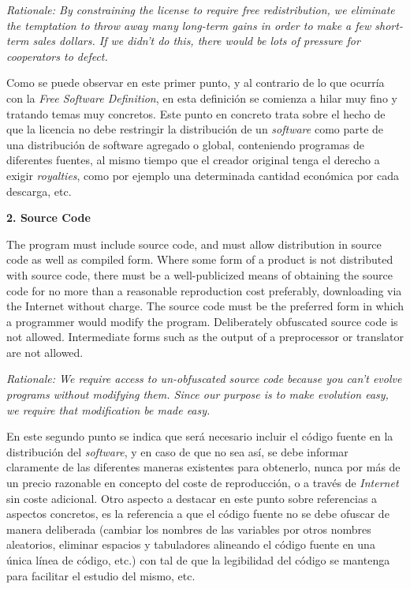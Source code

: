 \textit{Rationale: By constraining the license to require free redistribution,
we eliminate the temptation to throw away many long-term gains in order to make
a few short-term sales dollars. If we didn't do this, there would be lots
of pressure for cooperators to defect.}\vspace{0.4cm}

Como se puede observar en este primer punto, y al contrario de lo que ocurría
con la \textit{Free Software Definition}, en esta definición se comienza a hilar
muy fino y tratando temas muy concretos. Este punto en concreto trata sobre
el hecho de que la licencia no debe restringir la distribución de un
\textit{software} como parte de una distribución de software agregado o global,
conteniendo programas de diferentes fuentes, al mismo tiempo que el creador
original tenga el derecho a exigir \textit{royalties}, como por ejemplo una
determinada cantidad económica por cada descarga, etc.\vspace{0.4cm}

{\bf 2. Source Code

The program must include source code, and must allow distribution in source code
as well as compiled form. Where some form of a product is not distributed with
source code, there must be a well-publicized means of obtaining the source code
for no more than a reasonable reproduction cost preferably, downloading via the
Internet without charge. The source code must be the preferred form in which a
programmer would modify the program. Deliberately obfuscated source code is not
allowed. Intermediate forms such as the output of a preprocessor or translator
are not allowed.}

\textit{Rationale: We require access to un-obfuscated source code because you
can't evolve programs without modifying them. Since our purpose is to make
evolution easy, we require that modification be made easy.}\vspace{0.4cm}

En este segundo punto se indica que será necesario incluir el código fuente en
la distribución del \textit{software}, y en caso de que no sea así, se debe
informar claramente de las diferentes maneras existentes para obtenerlo, nunca
por más de un precio razonable en concepto del coste de reproducción, o a través
de \textit{Internet} sin coste adicional. Otro aspecto a destacar en este punto
sobre referencias a aspectos concretos, es la referencia a que el código fuente
no se debe ofuscar de manera deliberada (cambiar los nombres de las variables
por otros nombres aleatorios, eliminar espacios y tabuladores alineando el
código fuente en una única línea de código, etc.) con tal de que la legibilidad
del código se mantenga para facilitar el estudio del mismo, etc.\vspace{0.4cm}

